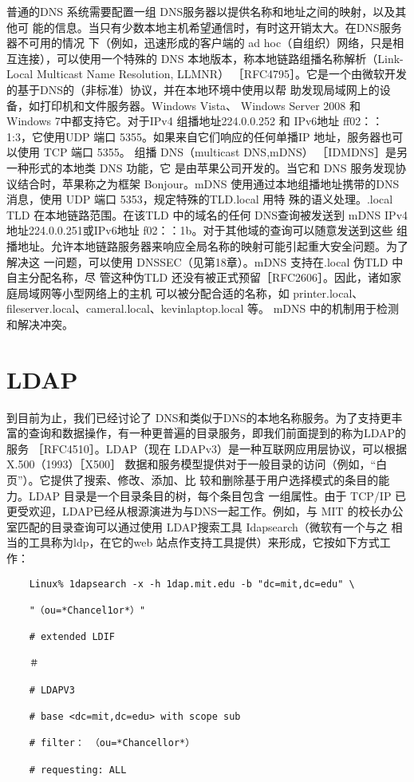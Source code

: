 普通的DNS 系统需要配置一组 DNS服务器以提供名称和地址之间的映射，以及其他可
能的信息。当只有少数本地主机希望通信时，有时这开销太大。在DNS服务器不可用的情况
下（例如，迅速形成的客户端的 ad hoc（自组织）网络，只是相互连接），可以使用一个特殊的
DNS 本地版本，称本地链路组播名称解析（Link-Local Multicast Name Resolution, LLMNR）
［RFC4795］。它是一个由微软开发的基于DNS的（非标准）协议，并在本地环境中使用以帮
助发现局域网上的设备，如打印机和文件服务器。Windows Vista、 Windows Server 2008 和
Windows 7中都支持它。对于IPv4 组播地址224.0.0.252 和 IPv6地址 ff02：：1:3，它使用UDP
端口 5355。如果来自它们响应的任何单播IP 地址，服务器也可以使用 TCP 端口 5355。
组播 DNS（multicast DNS,mDNS） ［IDMDNS］是另一种形式的本地类 DNS 功能，它
是由苹果公司开发的。当它和 DNS 服务发现协议结合时，苹果称之为框架 Bonjour。mDNS
使用通过本地组播地址携带的DNS消息，使用 UDP 端口 5353，规定特殊的TLD.local 用特
殊的语义处理。.local TLD 在本地链路范围。在该TLD 中的域名的任何 DNS查询被发送到
mDNS IPv4地址224.0.0.251或IPv6地址 f02：：1b。对于其他域的查询可以随意发送到这些
组播地址。允许本地链路服务器来响应全局名称的映射可能引起重大安全问题。为了解决这
一问题，可以使用 DNSSEC（见第18章）。mDNS 支持在.local 伪TLD 中自主分配名称，尽
管这种伪TLD 还没有被正式预留［RFC2606］。因此，诸如家庭局域网等小型网络上的主机
可以被分配合适的名称，如 printer.local、fileserver.local、cameral.local、kevinlaptop.local 等。
mDNS 中的机制用于检测和解决冲突。

\section{LDAP}

到目前为止，我们已经讨论了 DNS和类似于DNS的本地名称服务。为了支持更丰
富的查询和数据操作，有一种更普遍的目录服务，即我们前面提到的称为LDAP的服务
［RFC4510］。LDAP（现在 LDAPv3）是一种互联网应用层协议，可以根据 X.500（1993）［X500］
数据和服务模型提供对于一般目录的访问（例如，“白页”）。它提供了搜索、修改、添加、比
较和删除基于用户选择模式的条目的能力。LDAP 目录是一个目录条目的树，每个条目包含
一组属性。由于 TCP/IP 已更受欢迎，LDAP已经从根源演进为与DNS一起工作。例如，与
MIT 的校长办公室匹配的目录查询可以通过使用 LDAP搜索工具 Idapsearch（微软有一个与之
相当的工具称为ldp，在它的web 站点作支持工具提供）来形成，它按如下方式工作：

\begin{verbatim}
    Linux% 1dapsearch -x -h 1dap.mit.edu -b "dc=mit,dc=edu" \
    
    "（ou=*Chancel1or*）"
    
    # extended LDIF
    
    ＃
    
    # LDAPV3
    
    # base <dc=mit,dc=edu> with scope sub
    
    # filter： （ou=*Chancellor*）
    
    # requesting: ALL
\end{verbatim}

